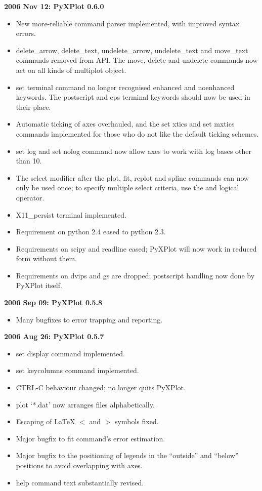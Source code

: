 \documentclass[a4paper,onecolumn,11pt]{book}
\begin{document}
\noindent \textbf{2006 Nov 12: PyXPlot 0.6.0}
\begin{itemize}
\item New more-reliable command parser implemented, with improved syntax errors.
\item delete\_arrow, delete\_text, undelete\_arrow, undelete\_text and move\_text commands removed from API. The move, delete and undelete commands now act on all kinds of multiplot object.
\item set terminal command no longer recognised enhanced and noenhanced keywords. The postscript and eps terminal keywords should now be used in their place.
\item Automatic ticking of axes overhauled, and the set xtics and set mxtics commands implemented for those who do not like the default ticking schemes.
\item set log and set nolog command now allow axes to work with log bases other than 10.
\item The select modifier after the plot, fit, replot and spline commands can now only be used once; to specify multiple select criteria, use the and logical operator.
\item X11\_persist terminal implemented.
\item Requirement on python 2.4 eased to python 2.3.
\item Requirements on scipy and readline eased; PyXPlot will now work in reduced form without them.
\item Requirements on dvips and gs are dropped; postscript handling now done by PyXPlot itself.
\end{itemize}

\noindent \textbf{2006 Sep 09: PyXPlot 0.5.8}
\begin{itemize}
\item Many bugfixes to error trapping and reporting.
\end{itemize}

\noindent \textbf{2006 Aug 26: PyXPlot 0.5.7}
\begin{itemize}
\item set display command implemented.
\item set keycolumns command implemented.
\item CTRL-C behaviour changed; no longer quits PyXPlot.
\item plot `*.dat' now arranges files alphabetically.
\item Escaping of LaTeX $<$ and $>$ symbols fixed.
\item Major bugfix to fit command's error estimation.
\item Major bugfix to the positioning of legends in the ``outside'' and ``below'' positions to avoid overlapping with axes.
\item help command text substantially revised.
\end{itemize}
\end{document}
